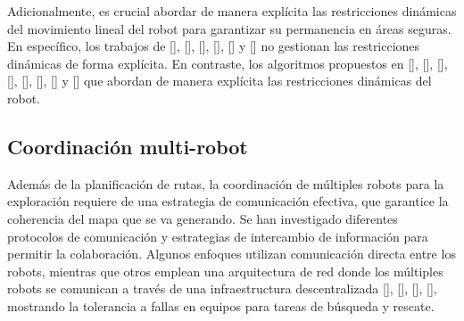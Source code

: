 
Adicionalmente, es crucial abordar de manera explícita las restricciones dinámicas del movimiento lineal del robot para garantizar su permanencia en áreas seguras. En específico, los trabajos de \citeauthor{CIESLEWSKI2017}[], \citeauthor{USENKO2017}[], \citeauthor{SELIN2019}[], \citeauthor{LIN2017}[], \citeauthor{COLLINS2019}[] y \citeauthor{BUG2019}[] no gestionan las restricciones dinámicas de forma explícita. En contraste, los algoritmos propuestos en \citeauthor{FLORENCE2018}[], \citeauthor{GAO2018}[], \citeauthor{OLEYNIKOVA2018}[], \citeauthor{PAPACHRISTOS2017}[], \citeauthor{MOHTA2017}[], \citeauthor{CINVES2021}[], \citeauthor{RACER2022}[] y \citeauthor{BARTOLOMEI2023}[] que abordan de manera explícita las restricciones dinámicas del robot.

\subsection{Coordinación multi-robot}

Adem\'{a}s de la planificaci\'{o}n de rutas, la coordinaci\'{o}n de m\'{u}ltiples robots para la exploración requiere de una estrategia de comunicaci\'{o}n efectiva, que garantice la coherencia del mapa que se va generando. Se han investigado diferentes protocolos de comunicaci\'{o}n y estrategias de intercambio de informaci\'{o}n para permitir la colaboraci\'{o}n. Algunos enfoques utilizan comunicaci\'{o}n directa entre los robots, mientras que otros emplean una arquitectura de red donde los m\'{u}ltiples robots se comunican a trav\'{e}s de una infraestructura descentralizada \citeauthor{10120943}[], \citeauthor{BARTOLOMEI2023}[], \citeauthor{RACER2022}[], \citeauthor{BARTOLOMEI2023}[], mostrando la tolerancia a fallas en equipos para tareas de b\'{u}squeda y rescate.

